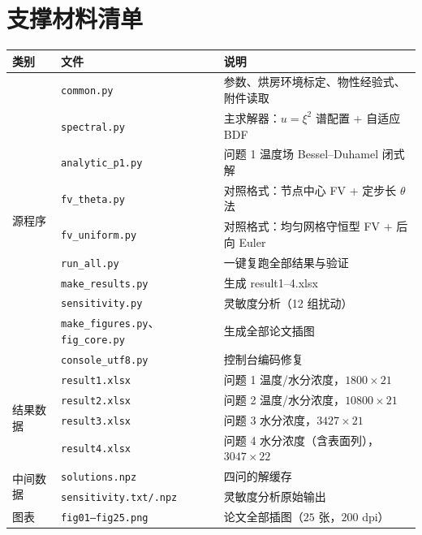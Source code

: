 \documentclass[bwprint]{cumcmthesis}
\begin{document}
\newpage
\appendix

\section{支撑材料清单}

\begin{table}[H]
\centering
\small
\begin{tabular}{@{}lll@{}}
\toprule
类别 & 文件 & 说明 \\
\midrule
\multirow{10}{*}{源程序}
 & \texttt{common.py} & 参数、烘房环境标定、物性经验式、附件读取 \\
 & \texttt{spectral.py} & 主求解器：$u=\xi^2$ 谱配置 + 自适应 BDF \\
 & \texttt{analytic\_p1.py} & 问题 1 温度场 Bessel--Duhamel 闭式解 \\
 & \texttt{fv\_theta.py} & 对照格式：节点中心 FV + 定步长 $\theta$ 法 \\
 & \texttt{fv\_uniform.py} & 对照格式：均匀网格守恒型 FV + 后向 Euler \\
 & \texttt{run\_all.py} & 一键复跑全部结果与验证 \\
 & \texttt{make\_results.py} & 生成 result1--4.xlsx \\
 & \texttt{sensitivity.py} & 灵敏度分析（12 组扰动） \\
 & \texttt{make\_figures.py}、\texttt{fig\_core.py} & 生成全部论文插图 \\
 & \texttt{console\_utf8.py} & 控制台编码修复 \\
\midrule
\multirow{4}{*}{结果数据}
 & \texttt{result1.xlsx} & 问题 1 温度/水分浓度，$1800\times21$ \\
 & \texttt{result2.xlsx} & 问题 2 温度/水分浓度，$10800\times21$ \\
 & \texttt{result3.xlsx} & 问题 3 水分浓度，$3427\times21$ \\
 & \texttt{result4.xlsx} & 问题 4 水分浓度（含表面列），$3047\times22$ \\
\midrule
\multirow{2}{*}{中间数据}
 & \texttt{solutions.npz} & 四问的解缓存 \\
 & \texttt{sensitivity.txt/.npz} & 灵敏度分析原始输出 \\
\midrule
图表 & \texttt{fig01--fig25.png} & 论文全部插图（$25$ 张，$200$ dpi） \\
\bottomrule
\end{tabular}
\end{table}
\end{document}
